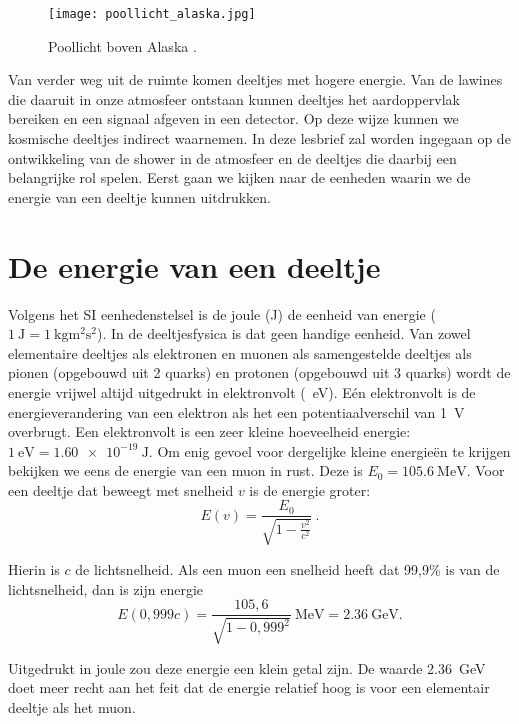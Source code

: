 \begin{figure}
    \centering
    \texttt{[image: poollicht\_alaska.jpg]}
    \caption{Poollicht boven Alaska \cite{strang}.}
    \label{fig:poollicht}
\end{figure}

Van verder weg uit de ruimte komen deeltjes met hogere energie. Van de
lawines die daaruit in onze atmosfeer ontstaan kunnen deeltjes het
aardoppervlak bereiken en een signaal afgeven in een \hisparc detector.
Op deze wijze kunnen we kosmische deeltjes indirect waarnemen. In deze
lesbrief zal worden ingegaan op de ontwikkeling van de shower in de
atmosfeer en de deeltjes die daarbij een belangrijke rol spelen. Eerst
gaan we kijken naar de eenheden waarin we de energie van een deeltje
kunnen uitdrukken. 


\section{De energie van een deeltje}

Volgens het SI eenhedenstelsel is de joule (J) de eenheid van energie
($\SI{1}{\joule} = \SI{1}{\kilo\gram\square\meter\square\second}$). In
de deeltjesfysica is dat geen handige eenheid. Van zowel elementaire
deeltjes als elektronen en muonen als samengestelde deeltjes als pionen
(opgebouwd uit 2 quarks) en protonen (opgebouwd uit 3 quarks) wordt de
energie vrijwel altijd uitgedrukt in elektronvolt
(\SI{}{\electronvolt}). Eén elektronvolt is de energieverandering van
een elektron als het een potentiaalverschil van \SI{1}{\volt} overbrugt.
Een elektronvolt is een zeer kleine hoeveelheid energie:
$\SI{1}{\electronvolt} = \SI{1,60e-19}{\joule}$. Om enig gevoel voor
dergelijke kleine energieën te krijgen bekijken we eens de energie van
een muon in rust. Deze is $E_0 = \SI{105,6}{\mega\electronvolt}$. Voor
een deeltje dat beweegt met snelheid $v$ is de energie groter:
\begin{equation}
    E(v) = \frac{E_0}{\sqrt{1-\frac{v^2}{c^2}}} \ . \nonumber
\end{equation}

Hierin is $c$ de lichtsnelheid. Als een muon een snelheid heeft dat
99,9\% is van de lichtsnelheid, dan is zijn energie 
\begin{equation}
    E(0,999c) = \frac{105,6}{\sqrt{1-0,999^2}}\SI{}{\mega\electronvolt}
    = \SI{2,36}{\giga\electronvolt}. \nonumber
\end{equation}

Uitgedrukt in joule zou deze energie een klein getal zijn. De waarde
\SI{2,36}{\giga\electronvolt} doet meer recht aan het feit dat de
energie relatief hoog is voor een elementair deeltje als het muon. 
\\

